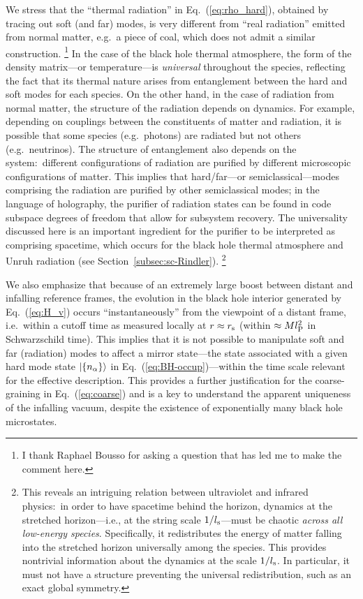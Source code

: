 \documentclass[12pt]{article}
\begin{document}
We stress that the ``thermal radiation'' in Eq.~(\ref{eq:rho_hard}), 
obtained by tracing out soft (and far) modes, is very different 
from ``real radiation'' emitted from normal matter, e.g.\ a piece 
of coal, which does not admit a similar construction.%
\footnote{I thank Raphael Bousso for asking a question that has 
 led me to make the comment here.}
In the case of the black hole thermal atmosphere, the form of the 
density matrix---or temperature---is {\it universal} throughout 
the species, reflecting the fact that its thermal nature arises 
from entanglement between the hard and soft modes for each species. 
On the other hand, in the case of radiation from normal matter, 
the structure of the radiation depends on dynamics.  For example, 
depending on couplings between the constituents of matter and 
radiation, it is possible that some species (e.g.\ photons) are 
radiated but not others (e.g.\ neutrinos).  The structure of 
entanglement also depends on the system:\ different configurations 
of radiation are purified by different microscopic configurations 
of matter.  This implies that hard/far---or semiclassical---modes 
comprising the radiation are purified by other semiclassical modes; 
in the language of holography, the purifier of radiation states 
can be found in code subspace degrees of freedom that allow for 
subsystem recovery.  The universality discussed here is an important 
ingredient for the purifier to be interpreted as comprising 
spacetime, which occurs for the black hole thermal atmosphere 
and Unruh radiation (see Section~\ref{subsec:sc-Rindler}).%
\footnote{This reveals an intriguing relation between ultraviolet 
 and infrared physics:\ in order to have spacetime behind the 
 horizon, dynamics at the stretched horizon---i.e., at the string 
 scale $1/l_{\rm s}$---must be chaotic {\it across all low-energy 
 species}.  Specifically, it redistributes the energy of matter 
 falling into the stretched horizon universally among the species. 
 This provides nontrivial information about the dynamics at the scale 
 $1/l_{\rm s}$.  In particular, it must not have a structure preventing 
 the universal redistribution, such as an exact global symmetry.}

We also emphasize that because of an extremely large boost between 
distant and infalling reference frames, the evolution in the 
black hole interior generated by Eq.~(\ref{eq:H_v}) occurs 
``instantaneously'' from the viewpoint of a distant frame, i.e.\ 
within a cutoff time as measured locally at $r \approx r_{\rm s}$ 
(within $\approx M l_{\rm P}^2$ in Schwarzschild time). 
This implies that it is not possible to manipulate soft 
and far (radiation) modes to affect a mirror state---the state 
associated with a given hard mode state $| \{ n_\alpha \} \rangle$ 
in Eq.~(\ref{eq:BH-occup})---within the time scale relevant for 
the effective description.  This provides a further justification 
for the coarse-graining in Eq.~(\ref{eq:coarse}) and is a key to 
understand the apparent uniqueness of the infalling vacuum, despite 
the existence of exponentially many black hole microstates.
\end{document}

